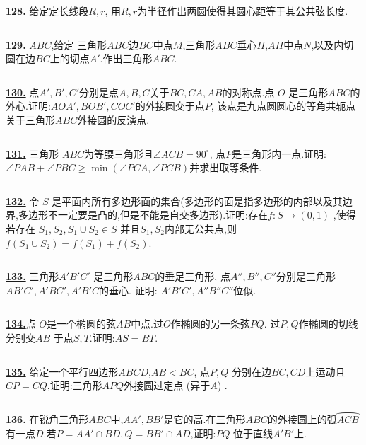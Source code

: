 \documentclass{article}
\begin{document}
$$ $$


\href{ http://www.artofproblemsolving.com/Forum/viewtopic.php?p=142514#p142514
}{\bf 128.} 给定定长线段$R,r$, 用$R,r$为半径作出两圆使得其圆心距等于其公共弦长度.


$$ $$


\href{ http://www.artofproblemsolving.com/Forum/viewtopic.php?p=142902#p142902
}{\bf 129.} $ABC$,给定 三角形$ABC$边$BC$中点$M$,三角形$ABC$垂心$H$,$AH$中点$N$,以及内切圆在边$BC$上的切点$A'$.作出三角形$ABC$.

$$ $$

\href{ http://www.artofproblemsolving.com/Forum/viewtopic.php?p=157721#p157721
}{\bf 130.} 点$A',B',C'$分别是点$A,B,C$关于$BC,CA,AB$的对称点.点 $O$ 是三角形$ABC$的外心.证明:$AOA',BOB',COC'$的外接圆交于点$P$, 该点是九点圆圆心的等角共轭点关于三角形$ABC$外接圆的反演点.


$$ $$


\href{ http://www.artofproblemsolving.com/Forum/viewtopic.php?p=159507#p159507
}{\bf 131.} 三角形 $ABC$为等腰三角形且$\angle ACB=90^{\circ}$, 点$P$是三角形内一点.证明: $\angle PAB+\angle PBC\ge\min(\angle PCA,\angle PCB)$并求出取等条件.


$$ $$


\href{ http://www.artofproblemsolving.com/Forum/viewtopic.php?p=189522#p189522
}{\bf 132.} 令 $S$ 是平面内所有多边形面的集合(多边形的面是指多边形的内部以及其边界,多边形不一定要是凸的,但是不能是自交多边形).证明:存在$f:S\to (0,1)$ ,使得若存在 $S_1,S_2,S_1\cup S_2\in S$ 并且$S_1,S_2$内部无公共点,则$f(S_1\cup S_2)=f(S_1)+f(S_2)$.


$$ $$


\href{http://www.artofproblemsolving.com/Forum/viewtopic.php?p=204466#p204466 }{\bf 133.} 三角形$A'B'C'$ 是三角形$ABC$的垂足三角形, 点$A'',B'',C''$分别是三角形$AB'C',A'BC',A'B'C$的垂心. 证明: $A'B'C',A''B''C''$位似.


$$ $$

\href{ http://www.artofproblemsolving.com/Forum/viewtopic.php?p=215657#p215657
}{\bf 134.}点 $O$是一个椭圆的弦$AB$中点.过$O$作椭圆的另一条弦$PQ$. 过$P,Q$作椭圆的切线分别交$AB$ 于点$S,T$.证明:$AS=BT$.


$$ $$


\href{http://www.artofproblemsolving.com/Forum/viewtopic.php?p=220177#p220177
 }{\bf 135.} 给定一个平行四边形$ABCD$,$AB<BC$, 点$P,Q$ 分别在边$BC,CD$上运动且$CP=CQ$,证明:三角形$APQ$外接圆过定点 (异于$A$) .


$$ $$


\href{ http://www.artofproblemsolving.com/Forum/viewtopic.php?p=220179#p220179
}{\bf 136.} 在锐角三角形$ABC$中,$AA',BB'$是它的高.在三角形$ABC$的外接圆上的弧$\wideparen{ACB}$有一点$D$.若$P=AA'\cap BD,Q=BB'\cap AD$,证明:$PQ$ 位于直线$A'B'$上.
\end{document}
